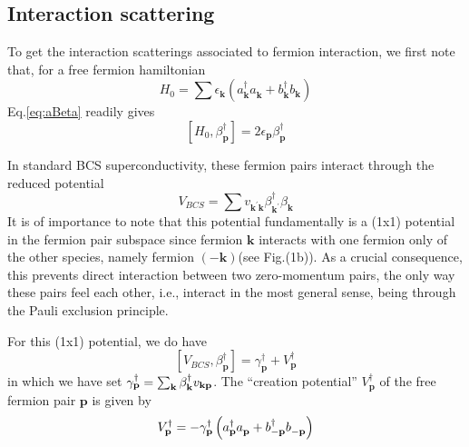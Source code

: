 \documentclass[aps,prb,superscriptaddress,showpacs,reprint,lengthcheck]{revtex4-1}
\newcommand{\vk}{\ensuremath{\mathbf{k}}}
\newcommand{\vp}{\ensuremath{\mathbf{p}}}
\begin{document}
\subsection{Interaction scattering}

To get the interaction scatterings associated to fermion interaction, we
first note that, for a free fermion hamiltonian 
\begin{equation}  \label{eq:h0}
H_0=\sum{\epsilon_\vk\left(a^{\dagger}_{\mathbf{k} } a^{}_{\mathbf{k}
}+b^{\dagger}_{\mathbf{k} } b^{}_{\mathbf{k} }\right) }
\end{equation}
Eq.\eqref{eq:aBeta} readily gives 
\begin{equation}  \label{eq:betaH}
\left[H_0,\beta^{\dagger}_\vp\right]  =2\epsilon_\vp\beta^{\dagger}_\vp
\end{equation}

In  standard BCS superconductivity, these fermion pairs interact through the reduced potential
\begin{equation}  \label{eq:vbcs}
V_{BCS}=\sum{v_{\mathbf{k} ^{\prime}\mathbf{k} }\beta^{\dagger}_{\mathbf{k}
^{\prime}}\beta^{}_{\mathbf{k} }}
\end{equation}
It is of importance to note that this potential fundamentally is a (1x1) potential in the fermion pair subspace since fermion $\mathbf{k}$ 
interacts with one fermion only of the other
species, namely fermion $\left(-\mathbf{k} \right)$(see Fig.(1b)). As a crucial consequence, this prevents direct interaction between two zero-momentum pairs, the only way these pairs feel each other, i.e., interact in the most general sense, being through the Pauli exclusion principle. 


  For this (1x1)
potential, we do have 
\begin{equation}  \label{eq:vbeta}
\left[V_{BCS},\beta^{\dagger}_\vp\right] 
=\gamma^{\dagger}_\vp+V^{\dagger}_\vp
\end{equation}
in which we have set $\gamma^{\dagger}_\vp=\sum_\vk\beta^{\dagger}_\vk{}v_{%
\mathbf{k} \mathbf{p} }$. The ``creation potential'' $V^{\dagger}_\vp$ of the free fermion pair 
$\mathbf{p} $ is given by 
\begin{equation}  \label{eq:betaV}
V^{\dagger}_\vp=-{\gamma^{\dagger}_\vp}\left(a^{\dagger}_{\mathbf{p} }a^{}_{%
\mathbf{p} }+b^{\dagger}_{-\mathbf{p} }b^{}_{-\mathbf{p} }\right) 
\end{equation}
\end{document}

